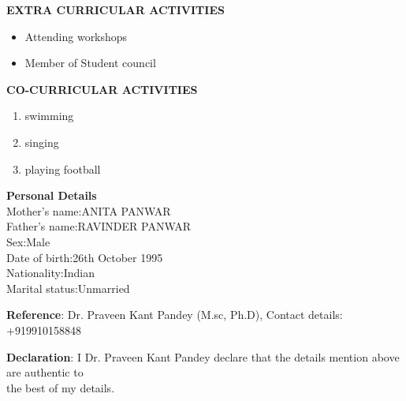 \documentclass{article}
\begin{document}
\begin{flushleft}
	\vspace{0.2in}
	
		\textbf{EXTRA CURRICULAR ACTIVITIES}
	\begin{itemize}
		\item Attending workshops
	 	\item Member of Student council
	\end{itemize}
\end{flushleft}

\begin{flushleft}
	\vspace{0.2in}
	
		\textbf{CO-CURRICULAR ACTIVITIES}
	\begin{enumerate}
		\item swimming
	 	\item singing
		\item playing football
	\end{enumerate}
\end{flushleft}

\begin{flushleft}
	\vspace{0.4in}
	\textbf{Personal Details}\\
	\hspace{1.5in}Mother's name:\hspace{.08in}ANITA PANWAR\\
	\hspace{1.5in}Father's name:\hspace{.1in}RAVINDER PANWAR\\
	\hspace{1.5in}Sex:\hspace{.75in}Male\\
	\hspace{1.5in}Date of birth:\hspace{.15in}26th October 1995\\
	\hspace{1.5in}Nationality:\hspace{.27in}Indian\\
	\hspace{1.5in}Marital status:\hspace{.09in}Unmarried\\
\end{flushleft}
\begin{flushleft}
	\vspace{0.1in}
	\textbf{Reference}\hspace{0.36in}: Dr. Praveen Kant Pandey (M.sc, Ph.D), Contact details: +919910158848\\
\end{flushleft}

\begin{flushleft}
	\vspace{0.1in}
	\textbf{Declaration}\hspace{0.25in}: I Dr. Praveen Kant Pandey declare that the details mention above are authentic to \\
	\hspace{1.15in}the best of my details.\\
\end{flushleft}
\end{document}
